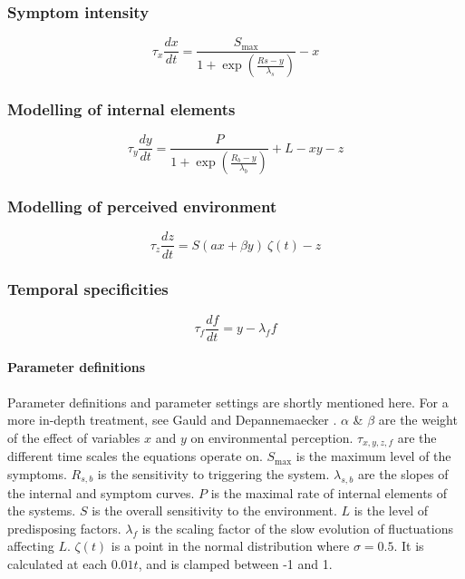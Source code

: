 \documentclass[utf8]{FrontiersinVancouver}
\begin{document}
\subsubsection{Symptom intensity}
\begin{equation}
    \tau_{x}\frac{dx}{dt} = \frac{S_{\max}}{1+\exp(\frac{Rs-y}{\lambda_{s}})} - x
\end{equation}

\subsubsection{Modelling of internal elements}
\begin{equation}
    \tau_{y}\frac{dy}{dt} = \frac{P}{1+\exp(\frac{R_{b}-y}{\lambda_{b}})} + L - xy - z
\end{equation}

\subsubsection{Modelling of perceived environment}
\begin{equation}
    \tau_{z}\frac{dz}{dt} = S(ax + \beta y)\ \zeta(t) - z
\end{equation}

\subsubsection{Temporal specificities}
\begin{equation}
    \tau_f\frac{df}{dt} = y - \lambda_f f
\end{equation}

\paragraph{Parameter definitions}
Parameter definitions and parameter settings are shortly mentioned here. For a more in-depth treatment, see Gauld and Depannemaecker \citep{gauldDynamicalSystemsComputational2023}. $\alpha$ \& $\beta$ are the weight of the effect of variables $x$ and $y$ on environmental perception. $\tau_{x,y,z,f}$ are the different time scales the equations operate on. $S_{\max}$ is the maximum level of the symptoms. $R_{s, b}$ is the sensitivity to triggering the system.  $\lambda_{s,b}$ are the slopes of the internal and symptom curves. $P$ is the maximal rate of internal elements of the systems. $S$ is the overall sensitivity to the environment. $L$ is the level of predisposing factors. $\lambda_{f}$ is the scaling factor of the slow evolution of fluctuations affecting $L$. $\zeta(t)$ is a point in the normal distribution where $\sigma = 0.5$. It is calculated at each $0.01t$, and is clamped between -1 and 1. 
\end{document}
